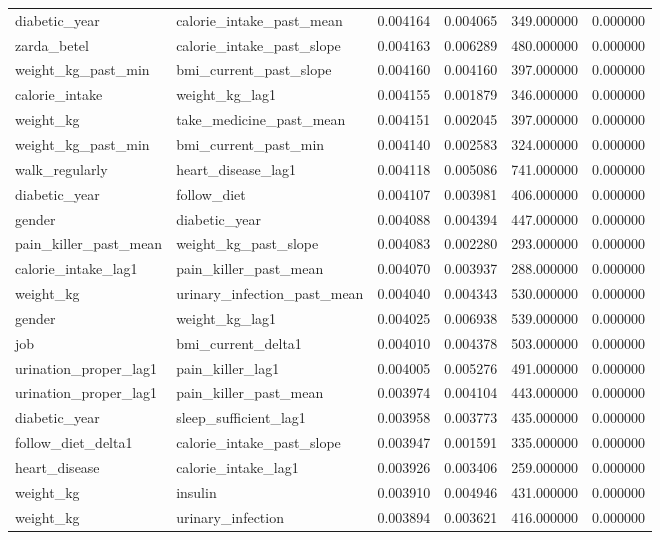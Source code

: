 \begin{longtable}{llrrrr}
diabetic\_year & calorie\_intake\_past\_mean & 0.004164 & 0.004065 & 349.000000 & 0.000000 \\
zarda\_betel & calorie\_intake\_past\_slope & 0.004163 & 0.006289 & 480.000000 & 0.000000 \\
weight\_kg\_past\_min & bmi\_current\_past\_slope & 0.004160 & 0.004160 & 397.000000 & 0.000000 \\
calorie\_intake & weight\_kg\_lag1 & 0.004155 & 0.001879 & 346.000000 & 0.000000 \\
weight\_kg & take\_medicine\_past\_mean & 0.004151 & 0.002045 & 397.000000 & 0.000000 \\
weight\_kg\_past\_min & bmi\_current\_past\_min & 0.004140 & 0.002583 & 324.000000 & 0.000000 \\
walk\_regularly & heart\_disease\_lag1 & 0.004118 & 0.005086 & 741.000000 & 0.000000 \\
diabetic\_year & follow\_diet & 0.004107 & 0.003981 & 406.000000 & 0.000000 \\
gender & diabetic\_year & 0.004088 & 0.004394 & 447.000000 & 0.000000 \\
pain\_killer\_past\_mean & weight\_kg\_past\_slope & 0.004083 & 0.002280 & 293.000000 & 0.000000 \\
calorie\_intake\_lag1 & pain\_killer\_past\_mean & 0.004070 & 0.003937 & 288.000000 & 0.000000 \\
weight\_kg & urinary\_infection\_past\_mean & 0.004040 & 0.004343 & 530.000000 & 0.000000 \\
gender & weight\_kg\_lag1 & 0.004025 & 0.006938 & 539.000000 & 0.000000 \\
job & bmi\_current\_delta1 & 0.004010 & 0.004378 & 503.000000 & 0.000000 \\
urination\_proper\_lag1 & pain\_killer\_lag1 & 0.004005 & 0.005276 & 491.000000 & 0.000000 \\
urination\_proper\_lag1 & pain\_killer\_past\_mean & 0.003974 & 0.004104 & 443.000000 & 0.000000 \\
diabetic\_year & sleep\_sufficient\_lag1 & 0.003958 & 0.003773 & 435.000000 & 0.000000 \\
follow\_diet\_delta1 & calorie\_intake\_past\_slope & 0.003947 & 0.001591 & 335.000000 & 0.000000 \\
heart\_disease & calorie\_intake\_lag1 & 0.003926 & 0.003406 & 259.000000 & 0.000000 \\
weight\_kg & insulin & 0.003910 & 0.004946 & 431.000000 & 0.000000 \\
weight\_kg & urinary\_infection & 0.003894 & 0.003621 & 416.000000 & 0.000000 \\

\end{longtable}
